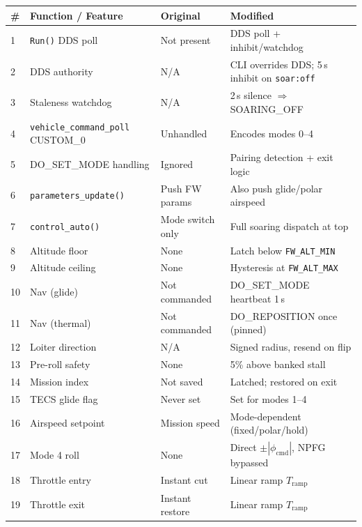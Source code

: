 \documentclass[12pt,a4paper]{article}
\begin{document}
\begin{center}
\renewcommand{\arraystretch}{1.3}
\begin{tabular}{p{0.3cm}p{3.2cm}p{4cm}p{4.2cm}}
\toprule
\# & Function / Feature & Original & Modified \\
\midrule
1 & \texttt{Run()} DDS poll & Not present & DDS poll + inhibit/watchdog \\
2 & DDS authority & N/A & CLI overrides DDS; 5\,s inhibit on \texttt{soar:off} \\
3 & Staleness watchdog & N/A & 2\,s silence $\Rightarrow$ SOARING\_OFF \\
4 & \texttt{vehicle\_command\_poll} CUSTOM\_0 & Unhandled & Encodes modes 0--4 \\
5 & DO\_SET\_MODE handling & Ignored & Pairing detection + exit logic \\
6 & \texttt{parameters\_update()} & Push FW params & Also push glide/polar airspeed \\
7 & \texttt{control\_auto()} & Mode switch only & Full soaring dispatch at top \\
8 & Altitude floor & None & Latch below \texttt{FW\_ALT\_MIN} \\
9 & Altitude ceiling & None & Hysteresis at \texttt{FW\_ALT\_MAX} \\
10 & Nav (glide) & Not commanded & DO\_SET\_MODE heartbeat 1\,s \\
11 & Nav (thermal) & Not commanded & DO\_REPOSITION once (pinned) \\
12 & Loiter direction & N/A & Signed radius, resend on flip \\
13 & Pre-roll safety & None & 5\% above banked stall \\
14 & Mission index & Not saved & Latched; restored on exit \\
15 & TECS glide flag & Never set & Set for modes 1--4 \\
16 & Airspeed setpoint & Mission speed & Mode-dependent (fixed/polar/hold) \\
17 & Mode 4 roll & None & Direct $\pm|\phi_{\text{cmd}}|$, NPFG bypassed \\
18 & Throttle entry & Instant cut & Linear ramp $T_{\text{ramp}}$ \\
19 & Throttle exit & Instant restore & Linear ramp $T_{\text{ramp}}$ \\
\bottomrule
\end{tabular}
\end{center}
\end{document}
